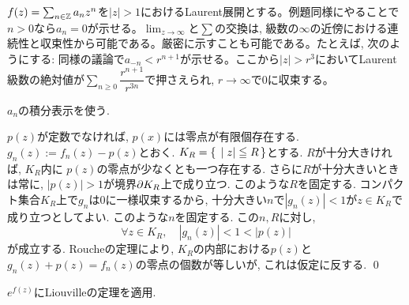 \begin{probans}
$f(z) = \sum_{n\in \mathbb{Z}} a_nz^{n}$を$|z|>1$におけるLaurent展開とする。例題同様にやることで$n>0$なら$a_n = 0$が示せる。$\lim_{z\to \infty}$と$\sum$の交換は, 級数の$\infty$の近傍における連続性と収束性から可能である。厳密に示すことも可能である。たとえば, 次のようにする: 同様の議論で$a_{-n} < r^{n+1}$が示せる。ここから$|z| > r^3$においてLaurent級数の絶対値が$\sum_{n\geq 0} \dfrac{r^{n+1}}{r^{3n}}$で押さえられ, $r\to \infty$で$0$に収束する。
\end{probans}

\begin{probans}
$a_n$の積分表示を使う.
\end{probans}
\begin{probans} $p(z)$が定数でなければ, $p(x)$には零点が有限個存在する.
$g_n(z) := f_n(z) - p(z)$とおく. $K_R = \set{|z|\leqq R}$とする. $R$が十分大きければ, $K_R$内に $p(z)$の零点が少なくとも一つ存在する. さらに$R$が十分大きいときは常に, $|p(z)| > 1$が境界$\partial K_R$上で成り立つ. このような$R$を固定する. コンパクト集合$K_R$上で$g_n$は$0$に一様収束するから, 十分大きい$n$で$|g_n(z)| < 1$が$z\in K_R$で成り立つとしてよい. このような$n$を固定する. この$n,R$に対し,
\[\forall z\in K_R,\quad |g_n(z)| <1< |p(z)|\]
が成立する. Roucheの定理により, $K_R$の内部における$p(z)$と$g_n(z) + p(z) = f_n(z)$の零点の個数が等しいが, これは仮定に反する. \qed
\end{probans}

\begin{probans}
$e^{f(z)}$にLiouvilleの定理を適用.
\end{probans}








\newpage

